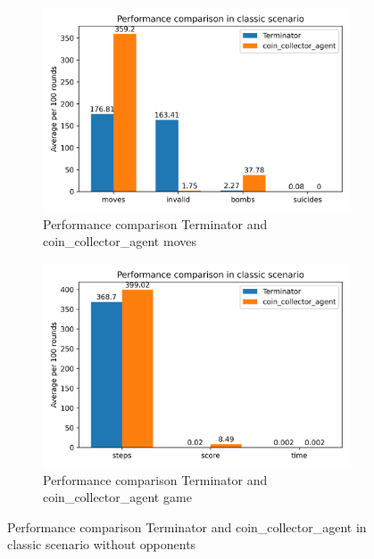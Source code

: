 \documentclass[
	letterpaper, %
	12pt, %
]{CSUniSchoolLabReport}
\begin{document}
\begin{figure}[H]

	\begin{subfigure}{\textwidth}
		\centering
		\includegraphics[scale=0.6]{Figures/Task2-1.png}
		\caption{Performance comparison Terminator and coin\_collector\_agent moves}
		\label{img:Task2-1}
	\end{subfigure}


	\begin{subfigure}{\textwidth}
		\centering
		\includegraphics[scale=0.6]{Figures/Task2-2.png}
		\caption{Performance comparison Terminator and coin\_collector\_agent game}
		\label{img:Task2-2}
	\end{subfigure}

	\caption{Performance comparison Terminator and coin\_collector\_agent in classic scenario without opponents}
	\label{img:Task2}

\end{figure}
\end{document}
